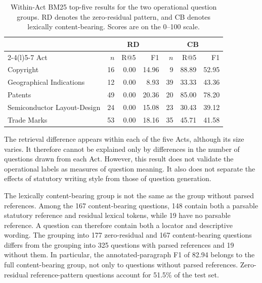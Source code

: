 \documentclass[pdflatex,sn-basic]{sn-jnl}%
\theoremstyle{thmstyleone}%
\theoremstyle{thmstyletwo}%
\theoremstyle{thmstylethree}%
\begin{document}
\begin{table}[!htbp]
    \caption{Within-Act BM25 top-five results for the two operational question
    groups. RD denotes the zero-residual pattern, and CB denotes lexically
    content-bearing. Scores are on the 0--100 scale.}
    \label{tab:within_act_question_groups}
    \centering
    \scriptsize
    \setlength{\tabcolsep}{4pt}
    \begin{tabular}{@{}lrrrrrr@{}}
        \toprule
        & \multicolumn{3}{c}{RD} & \multicolumn{3}{c}{CB} \\
        \cmidrule(lr){2-4}\cmidrule(l){5-7}
        Act & $n$ & R@5 & F1 & $n$ & R@5 & F1 \\
        \midrule
        Copyright                    & 16 & 0.00 & 14.96 & 9  & 88.89 & 52.95 \\
        Geographical Indications     & 12 & 0.00 & 8.93  & 39 & 33.33 & 43.36 \\
        Patents                      & 49 & 0.00 & 20.36 & 20 & 85.00 & 78.20 \\
        Semiconductor Layout-Design  & 24 & 0.00 & 15.08 & 23 & 30.43 & 39.12 \\
        Trade Marks                  & 53 & 0.00 & 18.16 & 35 & 45.71 & 41.58 \\
        \bottomrule
    \end{tabular}
\end{table}

The retrieval difference appears within each of the five Acts, although its
size varies. It therefore cannot be explained only by differences in the
number of questions drawn from each Act. However, this result does not validate
the operational labels as measures of question meaning. It also does not
separate the effects of statutory writing style from those of question
generation.

The lexically content-bearing group is not the same as the group without
parsed references. Among the 167 content-bearing questions, 148 contain both a
parsable statutory reference and residual lexical tokens, while 19 have no
parsable reference. A question can therefore contain both a locator and
descriptive wording. The grouping into 177 zero-residual and 167
content-bearing questions differs from the grouping into 325 questions with
parsed references and 19 without them. In particular, the
annotated-paragraph F1 of 82.94 belongs to the full content-bearing group, not
only to questions without parsed references. Zero-residual reference-pattern
questions account for 51.5\% of the test set.
\end{document}

